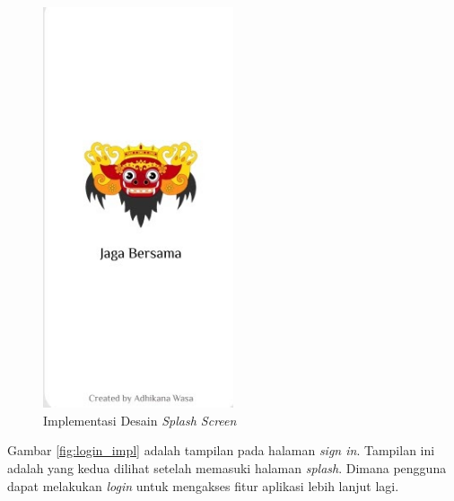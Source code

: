 \begin{figure} [!ht]
  \centering
  \includegraphics[width=0.5\textwidth]{gambar/splash.jpg}
  \caption{Implementasi Desain \textit{Splash Screen}}
  \label{fig:splash_impl}
\end{figure}

Gambar \ref{fig:login_impl} adalah tampilan pada halaman \textit{sign in}. Tampilan ini adalah yang kedua dilihat setelah memasuki halaman \textit{splash}. Dimana pengguna dapat melakukan \textit{login} untuk mengakses fitur aplikasi lebih lanjut lagi.

